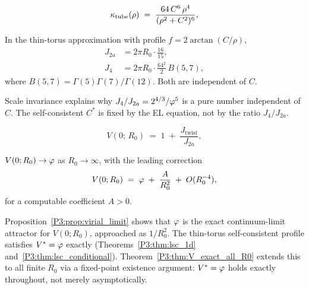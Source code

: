 \begin{equation}
  \kappa_{\mathrm{tube}}(\rho) \;=\; \frac{64\,C^6\,\rho^4}{(\rho^2+C^2)^6},
  \label{P3:eq:kappa_torus}
\end{equation}

\begin{proposition}
\label{P3:prop:scale_inv}
In the thin-torus approximation with profile $f = 2\arctan(C/\rho)$,
\begin{align}
  J_{2a} &= 2\pi R_0 \cdot \frac{16}{15}, \label{P3:eq:Ja_exact}\\
  J_4    &= 2\pi R_0 \cdot \frac{64^2}{2}\,B(5,7), \label{P3:eq:J4_exact}
\end{align}
where $B(5,7) = \Gamma(5)\Gamma(7)/\Gamma(12)$.  Both are independent of $C$.
\end{proposition}

\begin{remark}
\label{P3:rem:scale_invariance_explains}
Scale invariance explains why $J_4/J_{2a} = 2^{4/3}/\varphi^5$ is a pure
number independent of $C$.  The self-consistent $C^*$ is fixed by the
EL equation, not by the ratio $J_4/J_{2a}$.
\end{remark}

\begin{equation}
  V(0;\,R_0) \;=\; 1 \;+\; \frac{J_{\mathrm{twist}}}{J_{2a}},
  \label{P3:eq:V0_split}
\end{equation}

\begin{proposition}
\label{P3:prop:virial_limit}
$V(0;R_0) \to \varphi$ as $R_0\to\infty$, with the leading correction
\begin{equation}
  V(0;R_0) \;=\; \varphi \;+\; \frac{A}{R_0^2} \;+\; O(R_0^{-4}),
  \label{P3:eq:V0_limit}
\end{equation}
for a computable coefficient $A > 0$.
\end{proposition}

\begin{remark}
\label{P3:rem:exact_for_all_R0}
Proposition~\ref{P3:prop:virial_limit} shows that $\varphi$ is the exact
continuum-limit attractor for $V(0;R_0)$, approached as $1/R_0^2$.
The thin-torus self-consistent profile satisfies $V^*=\varphi$ exactly
(Theorems~\ref{P3:thm:lsc_1d} and~\ref{P3:thm:lsc_conditional}).
Theorem~\ref{P3:thm:V_exact_all_R0} extends this to all finite $R_0$
via a fixed-point existence argument: $V^*=\varphi$ holds exactly
throughout, not merely asymptotically.
\end{remark}

